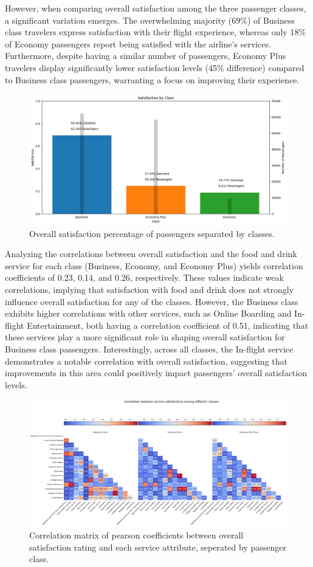 \documentclass[11pt]{article}
\begin{document}
However, when comparing overall satisfaction among the three passenger classes, a significant variation emerges. The overwhelming majority (69\%) of Business class travelers express satisfaction with their flight experience, whereas only 18\% of Economy passengers report being satisfied with the airline's services. Furthermore, despite having a similar number of passengers, Economy Plus travelers display significantly lower satisfaction levels (45\% difference) compared to Business class passengers, warranting a focus on improving their experience. 

\begin{figure}[h]
\centering
\includegraphics[width=0.6\linewidth]{project_files/project_94_0.png}
\caption{\centering Overall satisfaction percentage of passengers separated by classes.}
\end{figure} 

Analyzing the correlations between overall satisfaction and the food and drink service for each class (Business, Economy, and Economy Plus) yields correlation coefficients of 0.23, 0.14, and 0.26, respectively. These values indicate weak correlations, implying that satisfaction with food and drink does not strongly influence overall satisfaction for any of the classes. However, the Business class exhibits higher correlations with other services, such as Online Boarding and In-flight Entertainment, both having a correlation coefficient of 0.51, indicating that these services play a more significant role in shaping overall satisfaction for Business class passengers. Interestingly, across all classes, the In-flight service demonstrates a notable correlation with overall satisfaction, suggesting that improvements in this area could positively impact passengers' overall satisfaction levels. 

\begin{figure}[h]
\centering
\includegraphics[width=0.9\linewidth]{project_files/project_97_0.png}
\caption{\centering Correlation matrix of pearson coefficients between overall satisfaction rating and each service attribute, seperated by passenger class.}
\end{figure}
\end{document}
